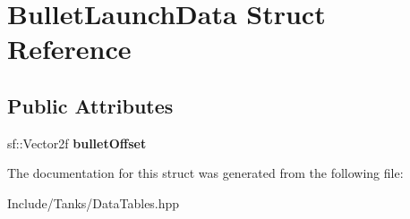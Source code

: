 \hypertarget{struct_bullet_launch_data}{}\section{Bullet\+Launch\+Data Struct Reference}
\label{struct_bullet_launch_data}
\subsection*{Public Attributes}
\begin{DoxyCompactItemize}
\item 
\hypertarget{struct_bullet_launch_data_a65b9266464911ffaa47834f86b50041d}{}sf\+::\+Vector2f {\bfseries bullet\+Offset}\label{struct_bullet_launch_data_a65b9266464911ffaa47834f86b50041d}

\end{DoxyCompactItemize}


The documentation for this struct was generated from the following file\+:\begin{DoxyCompactItemize}
\item 
Include/\+Tanks/Data\+Tables.\+hpp\end{DoxyCompactItemize}
